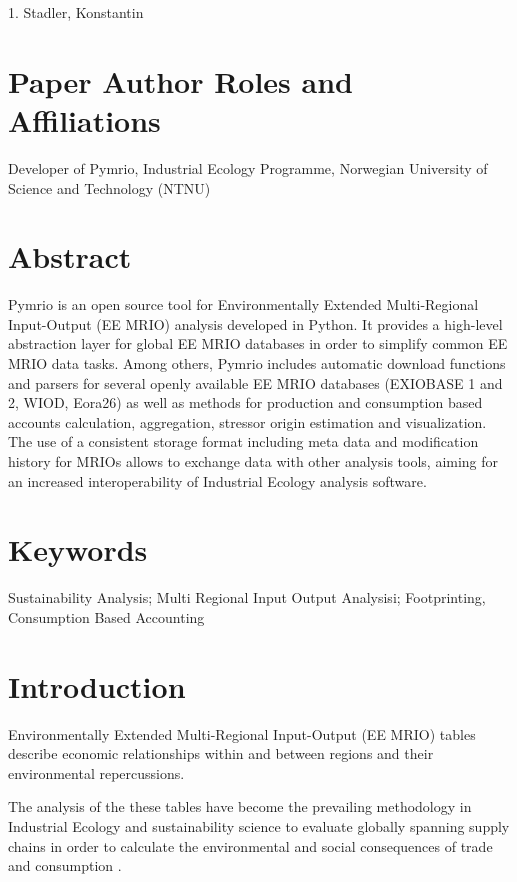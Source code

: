 \documentclass{jors}
\begin{document}
{1. Stadler, Konstantin

\section*{Paper Author Roles and Affiliations}
Developer of Pymrio, Industrial Ecology Programme, Norwegian University of Science and Technology (NTNU)

\section*{Abstract}


Pymrio is an open source tool for Environmentally Extended Multi-Regional Input-Output (EE MRIO) analysis developed in Python.
It provides a high-level abstraction layer for global EE MRIO databases in order to simplify common EE MRIO data tasks. 
Among others, Pymrio includes automatic download functions and parsers for several openly available EE MRIO databases (EXIOBASE 1 and 2, WIOD, Eora26) as well as methods for production and consumption based accounts calculation, aggregation, stressor origin estimation and visualization. 
The use of a consistent storage format including meta data and modification history for MRIOs allows to exchange data with other analysis tools, aiming for an increased interoperability of Industrial Ecology analysis software.

\section*{Keywords}

Sustainability Analysis; Multi Regional Input Output Analysisi; Footprinting, Consumption Based Accounting

\section*{Introduction}

Environmentally Extended Multi-Regional Input-Output (EE MRIO) tables describe economic relationships within and between regions and their environmental repercussions.

The analysis of the these tables have become the prevailing methodology in Industrial Ecology and sustainability science to evaluate globally spanning supply chains in order to calculate the environmental and social consequences of trade and consumption \cite{davis2010a,ivanova2017,tukker2016,verones2015,wood2018,wood2018a}.

}
\end{document}
